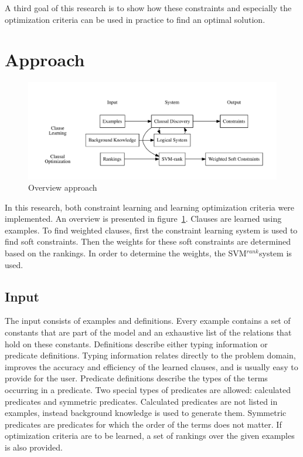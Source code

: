 \documentclass[letterpaper]{article}
\newcommand{\svm}{SVM$^{rank}$}
\theoremstyle{definition}
\begin{document}
A third goal of this research is to show how these constraints and especially the optimization criteria can be used in practice to find an optimal solution.

\section{Approach}
\begin{figure}

  \centering
    \includegraphics[width=0.8\linewidth]{ApproachOverview.pdf}
  \caption{Overview approach}
  \label{fig:struktuur}

\end{figure}

In this research, both constraint learning and learning optimization criteria were implemented.
An overview is presented in figure~\ref{fig:struktuur}.
Clauses are learned using examples.
To find weighted clauses, first the constraint learning system is used to find soft constraints.
Then the weights for these soft constraints are determined based on the rankings.
In order to determine the weights, the \svm system is used.

\subsection{Input}
The input consists of examples and definitions.
Every example contains a set of constants that are part of the model and an exhaustive list of the relations that hold on these constants.
Definitions describe either typing information or predicate definitions.
Typing information relates directly to the problem domain, improves the accuracy and efficiency of the learned clauses, and is usually easy to provide for the user.
Predicate definitions describe the types of the terms occurring in a predicate.
Two special types of predicates are allowed: calculated predicates and symmetric predicates.
Calculated predicates are not listed in examples, instead background knowledge is used to generate them.
Symmetric predicates are predicates for which the order of the terms does not matter.
If optimization criteria are to be learned, a set of rankings over the given examples is also provided.
\end{document}
